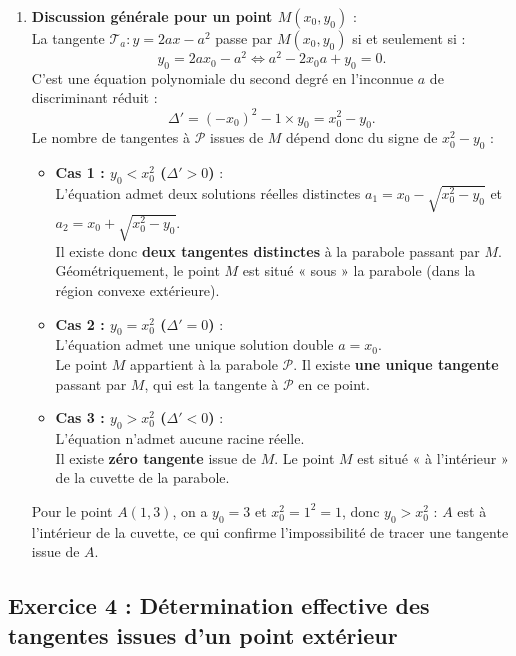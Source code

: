\documentclass[11pt,a4paper]{article}
\begin{document}
\begin{correctionbox}
\begin{enumerate}[label=\textbf{\arabic*.}]
\begin{enumerate}[label=\alph*.]
        \item \textbf{Discussion générale pour un point $M(x_0, y_0)$} :\\
        La tangente $\mathcal{T}_a : y = 2ax - a^2$ passe par $M(x_0, y_0)$ si et seulement si :
        \[
        y_0 = 2a x_0 - a^2 \iff a^2 - 2x_0 a + y_0 = 0.
        \]
        C'est une équation polynomiale du second degré en l'inconnue $a$ de discriminant réduit :
        \[
        \Delta' = (-x_0)^2 - 1 \times y_0 = x_0^2 - y_0.
        \]
        Le nombre de tangentes à $\mathcal{P}$ issues de $M$ dépend donc du signe de $x_0^2 - y_0$ :
        \begin{itemize}
            \item \textbf{Cas 1 : $y_0 < x_0^2$ ($\Delta' > 0$)} :\\
            L'équation admet deux solutions réelles distinctes $a_1 = x_0 - \sqrt{x_0^2 - y_0}$ et $a_2 = x_0 + \sqrt{x_0^2 - y_0}$.\\
            Il existe donc \textbf{deux tangentes distinctes} à la parabole passant par $M$. Géométriquement, le point $M$ est situé « sous » la parabole (dans la région convexe extérieure).
            \item \textbf{Cas 2 : $y_0 = x_0^2$ ($\Delta' = 0$)} :\\
            L'équation admet une unique solution double $a = x_0$.\\
            Le point $M$ appartient à la parabole $\mathcal{P}$. Il existe \textbf{une unique tangente} passant par $M$, qui est la tangente à $\mathcal{P}$ en ce point.
            \item \textbf{Cas 3 : $y_0 > x_0^2$ ($\Delta' < 0$)} :\\
            L'équation n'admet aucune racine réelle.\\
            Il existe \textbf{zéro tangente} issue de $M$. Le point $M$ est situé « à l'intérieur » de la cuvette de la parabole.
        \end{itemize}
        Pour le point $A(1, 3)$, on a $y_0 = 3$ et $x_0^2 = 1^2 = 1$, donc $y_0 > x_0^2$ : $A$ est à l'intérieur de la cuvette, ce qui confirme l'impossibilité de tracer une tangente issue de $A$.
    \end{enumerate}
\end{enumerate}
\end{correctionbox}

\subsection*{Exercice 4 : Détermination effective des tangentes issues d'un point extérieur}
\end{document}
